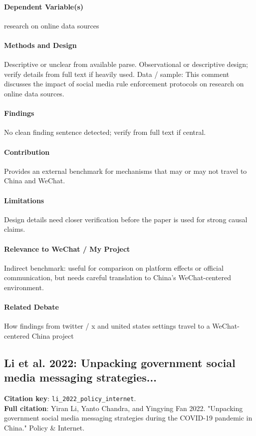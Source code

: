 \documentclass[12pt]{article}
\begin{document}
\paragraph{Dependent Variable(s)} research on online data sources

\paragraph{Methods and Design} Descriptive or unclear from available parse. Observational or descriptive design; verify details from full text if heavily used. Data / sample: This comment discusses the impact of social media rule enforcement protocols on research on online data sources.

\paragraph{Findings} No clean finding sentence detected; verify from full text if central.

\paragraph{Contribution} Provides an external benchmark for mechanisms that may or may not travel to China and WeChat.

\paragraph{Limitations} Design details need closer verification before the paper is used for strong causal claims.

\paragraph{Relevance to WeChat / My Project} Indirect benchmark: useful for comparison on platform effects or official communication, but needs careful translation to China's WeChat-centered environment.

\paragraph{Related Debate} How findings from twitter / x and united states settings travel to a WeChat-centered China project


\subsection{Li et al. 2022: Unpacking government social media messaging strategies...}
\textbf{Citation key}: \texttt{li\_2022\_policy\_internet}.\\
\textbf{Full citation}: Yiran Li, Yanto Chandra, and Yingying Fan 2022. "Unpacking government social media messaging strategies during the COVID-19 pandemic in China." Policy \& Internet.
\end{document}
